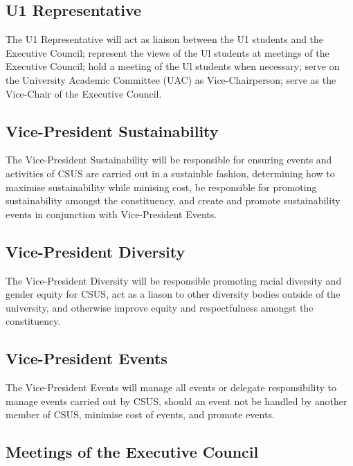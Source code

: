 \subsection{U1 Representative}\label{u1-representative}

The U1 Representative will act as liaison between the U1 students and
the Executive Council; represent the views of the Ul students at
meetings of the Executive Council; hold a meeting of the Ul students
when necessary; serve on the University Academic Committee (UAC) as
Vice-Chairperson; serve as the Vice-Chair of the Executive Council.

\subsection{Vice-President
Sustainability}\label{vice-president-sustainability}

The Vice-President Sustainability will be responsible for ensuring
events and activities of CSUS are carried out in a sustainble fashion,
determining how to maximise sustainability while minising cost, be
responsible for promoting sustainability amongst the constituency, and
create and promote sustainability events in conjunction with
Vice-President Events.

\subsection{Vice-President Diversity}\label{vice-president-diversity}

The Vice-President Diversity will be responsible promoting racial
diversity and gender equity for CSUS, act as a liason to other diversity
bodies outside of the university, and otherwise improve equity and
respectfulness amongst the constituency.

\subsection{Vice-President Events}\label{vice-president-events}

The Vice-President Events will manage all events or delegate
responsibility to manage events carried out by CSUS, should an event not
be handled by another member of CSUS, minimise cost of events, and
promote events.

\subsection{Meetings of the Executive
Council}\label{meetings-of-the-executive-council}

